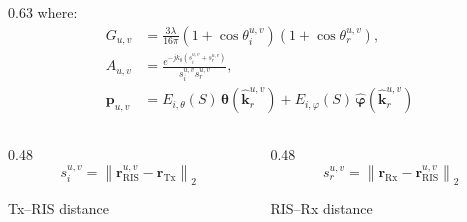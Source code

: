 \documentclass[11pt,aspectratio=1610]{beamer}
\begin{document}
\begin{frame}
\begin{columns}[T]
\begin{column}{0.63\textwidth}
                \vspace{-0.1cm}
                where:
                \small
                \begin{align*}
                G_{u,v}
                &=
                \frac{3\lambda}{16\pi}
                \left(1+\cos\theta_i^{u,v}\right)
                \left(1+\cos\theta_r^{u,v}\right),
                \\[0.35em]
                A_{u,v}
                &=
                \frac{
                e^{-j k_0 \left(s_i^{u,v}+s_r^{u,v}\right)}
                }{
                s_i^{u,v}s_r^{u,v}
                },
                \\[0.35em]
                \mathbf{p}_{u,v}
                &=
                E_{i,\theta}(S)\,
                \hat{\boldsymbol{\theta}}\!\left(\hat{\mathbf{k}}_r^{u,v}\right)
                +
                E_{i,\varphi}(S)\,
                \hat{\boldsymbol{\varphi}}\!\left(\hat{\mathbf{k}}_r^{u,v}\right)
                \end{align*}
                \vspace{-0.3cm}
                \begin{columns}[T,onlytextwidth]
                    \begin{column}{0.48\textwidth}
                        \begin{equation*}
                        s_i^{u,v}
                        =
                        \left\|
                        \mathbf{r}_{\mathrm{RIS}}^{u,v}
                        -
                        \mathbf{r}_{\mathrm{Tx}}
                        \right\|_2
                        \end{equation*}

                        \centering
                        {\small Tx--RIS distance}
                    \end{column}

                    \begin{column}{0.48\textwidth}
                        \begin{equation*}
                        s_r^{u,v}
                        =
                        \left\|
                        \mathbf{r}_{\mathrm{Rx}}
                        -
                        \mathbf{r}_{\mathrm{RIS}}^{u,v}
                        \right\|_2
                        \end{equation*}

                        \centering
                        {\small RIS--Rx distance}
                    \end{column}

                \end{columns}
            \end{column}
        \end{columns}
    \end{frame}
\end{document}

